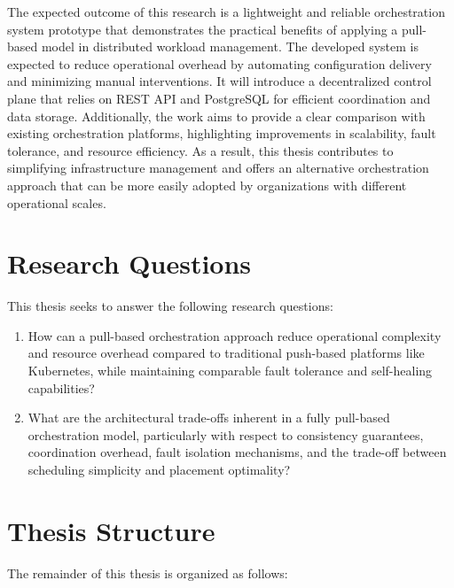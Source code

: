 The expected outcome of this research is a lightweight and reliable orchestration system prototype that demonstrates the practical benefits of applying a pull-based model in distributed workload management. The developed system is expected to reduce operational overhead by automating configuration delivery and minimizing manual interventions. It will introduce a decentralized control plane that relies on REST API and PostgreSQL for efficient coordination and data storage. Additionally, the work aims to provide a clear comparison with existing orchestration platforms, highlighting improvements in scalability, fault tolerance, and resource efficiency. As a result, this thesis contributes to simplifying infrastructure management and offers an alternative orchestration approach that can be more easily adopted by organizations with different operational scales.

\section{Research Questions}

This thesis seeks to answer the following research questions:

\begin{enumerate}[label=\textbf{RQ\arabic*.}, left=0pt]
\item How can a pull-based orchestration approach reduce operational complexity and resource overhead compared to traditional push-based platforms like Kubernetes, while maintaining comparable fault tolerance and self-healing capabilities?

\item What are the architectural trade-offs inherent in a fully pull-based orchestration model, particularly with respect to consistency guarantees, coordination overhead, fault isolation mechanisms, and the trade-off between scheduling simplicity and placement optimality?
\end{enumerate}

\section{Thesis Structure}

The remainder of this thesis is organized as follows:

